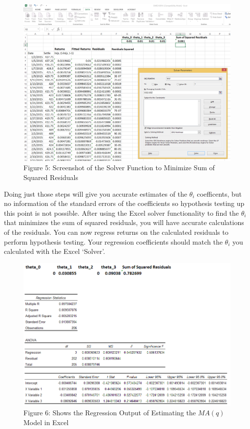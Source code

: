 \documentclass[
  letterpaper,
  DIV=11,
  numbers=noendperiod]{scrreprt}
\begin{document}
\begin{figure}

{\centering \includegraphics{images/12_solvermaq.png}

}

\caption{Figure 5: Screenshot of the Solver Function to Minimize Sum of
Squared Residuals}

\end{figure}

Doing just those steps will give you accurate estimates of the
\(\theta_i\) coefficents, but no information of the standard errors of
the coefficients so hypothesis testing up this point is not possible.
After using the Excel solver functionality to find the \(\theta_i\) that
minimizes the sum of squared residuals, you will have accurate
calculations of the residuals. You can now regress returns on the
calculated residuals to perform hypothesis testing. Your regression
coefficients should match the \(\theta_i\) you calculated with the Excel
`Solver'.

\begin{figure}

{\centering \includegraphics{images/12_ma2.png}

}

\caption{Figure 6: Shows the Regression Output of Estimating the
\(MA(q)\) Model in Excel}

\end{figure}
\end{document}
